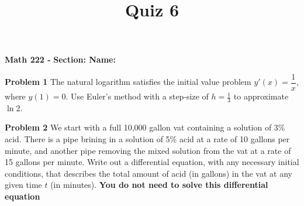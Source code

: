 \documentclass{article}
\title{Quiz 6}
\begin{document}
\begin{center}\makeatletter %
{ \bf Math 222 - \@title }
{ \bf \hfill Section: \underline{\hspace{2cm}} \hfill Name: \underline{\hspace{5cm}} }
\end{center}

{\bf Problem 1} \quad The natural logarithm satisfies the initial value problem $y'(x) = \dfrac{1}{x}$, where $y(1) = 0$.  Use Euler's method with a step-size of $h = \frac{1}{3}$ to approximate $\ln 2$.


\vfill

{\bf Problem 2} \quad We start with a full 10,000 gallon vat containing a solution of 3\% acid. There is a pipe brining in a solution of 5\% acid at a rate of 10 gallons per minute, and another pipe removing the mixed solution from the vat at a rate of 15 gallons per minute.  Write out a differential equation, with any necessary initial conditions, that describes the total amount of acid (in gallons) in the vat at any given time $t$ (in minutes). \textbf{You do not need to solve this differential equation}
\vfill
\end{document}

